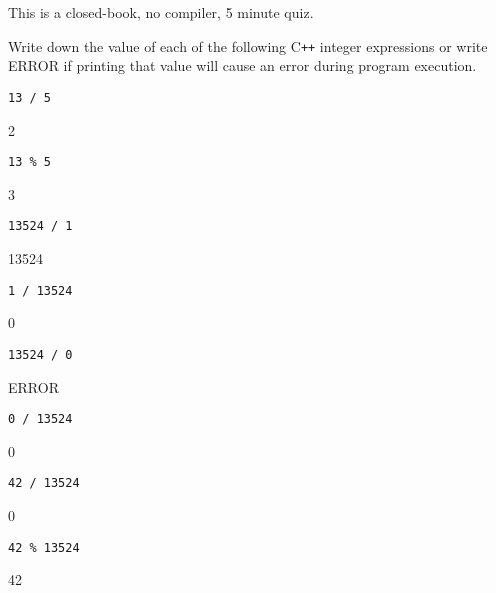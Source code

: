 

This is a closed-book, no compiler, 5 minute quiz.

Write down the value of each of the following C\texttt{++} integer expressions or
write ERROR if printing that value will cause an error during program execution.

\nextq
\verb!13 / 5!
\\
\ANSWER
\begin{answercode}
2
\end{answercode}

\nextq
\verb!13 % 5!
\\
\ANSWER
\begin{answercode}
3
\end{answercode}

\nextq
\verb!13524 / 1!
\\
\ANSWER
\begin{answercode}
13524
\end{answercode}

\nextq
\verb!1 / 13524!
\\
\ANSWER
\begin{answercode}
0
\end{answercode}

\nextq
\verb!13524 / 0!
\\
\ANSWER
\begin{answercode}
ERROR
\end{answercode}

\nextq
\verb!0 / 13524 !
\\
\ANSWER
\begin{answercode}
0
\end{answercode}

\nextq
\verb!42 / 13524!
\\
\ANSWER
\begin{answercode}
0
\end{answercode}

\nextq
\verb!42 % 13524!
\\
\ANSWER
\begin{answercode}
42
\end{answercode}

